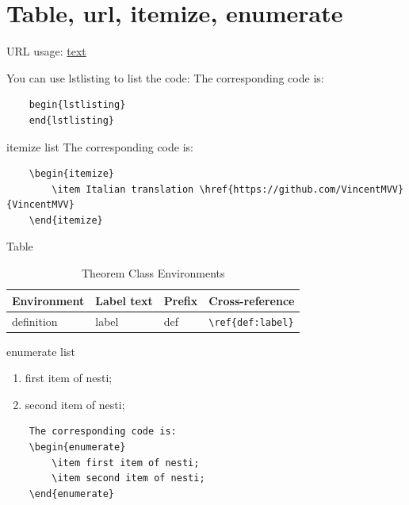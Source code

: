 \documentclass[11pt]{elegantbook}
\begin{document}
\section{Table, url, itemize, enumerate}
URL usage:
\href{URL}{text}

You can use lstlisting to list the code:
The corresponding code is: 
\begin{lstlisting}
	begin{lstlisting}
	end{lstlisting}
\end{lstlisting}

itemize list
The corresponding code is: 
\begin{lstlisting}
	\begin{itemize}
		\item Italian translation \href{https://github.com/VincentMVV}{VincentMVV} 
	\end{itemize}
\end{lstlisting}

Table
\begin{table}[htbp]
	\centering
	\caption{Theorem Class Environments}
	\begin{tabular}{llll}
		\toprule
		Environment & Label text & Prefix & Cross-reference \\
		\midrule
		definition & label & def   & \lstinline|\ref{def:label}| \\
		\bottomrule
	\end{tabular}%
	\label{tab:theorem-class}%
\end{table}%

enumerate list
\begin{enumerate}
	\item first item of nesti;
	\item second item of nesti;
\end{enumerate}
\begin{lstlisting}
	The corresponding code is: 
	\begin{enumerate}
		\item first item of nesti;
		\item second item of nesti;
	\end{enumerate}
\end{lstlisting}
\end{document}
